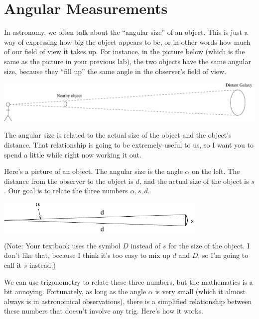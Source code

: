 \section{Angular Measurements}

\makelabheader %

\bigskip

In astronomy, we often talk about the ``angular size'' of an object.
This is just a way of expressing how big the object appears to be, or
in other words how much of our field of view it takes up.  For
instance, in the picture below (which is the same as the picture in
your previous lab), the two objects have the same angular size,
because they ``fill up'' the same angle in the observer's
field of view.

\bigskip
\centerline{\includegraphics[width=\textwidth]{localdistance/localdistance1.pdf}}
\bigskip

The angular size is related to the actual size of the object and the
object's distance.  That relationship is going to be extremely useful
to us, so I want you to spend a little while right now working it out.

Here's a picture of an object.  The angular size is the angle $\alpha$
on the left.  The distance from the observer to the object is $d$, and
the actual size of the object is $s$.  Our goal is to relate the
three numbers $\alpha,s,d$.

\bigskip
\centerline{\includegraphics[width=4in]{angularsize/angularsizefig1.pdf}}
\bigskip

(Note: Your textbook uses the symbol $D$ instead of $s$ for
the size of the object.  I don't like that, because I think it's
too easy to mix up $d$ and $D$, so I'm going to call it $s$ instead.)

We can use trigonometry to relate these three numbers, but the
mathematics is a bit annoying.  Fortunately, as long as the angle
$\alpha$ is very small (which it almost always is
in astronomical observations), there is a simplified
relationship between these numbers that doesn't involve
any trig.  Here's how it works.

